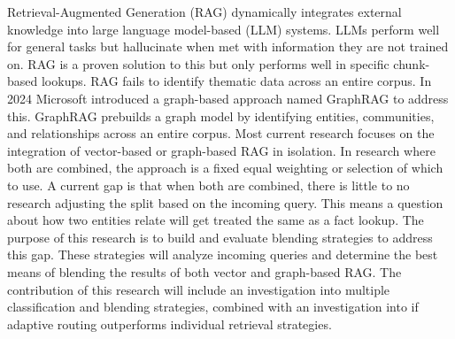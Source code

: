 Retrieval-Augmented Generation (RAG) dynamically integrates external knowledge into large language model-based (LLM) systems.  
LLMs perform well for general tasks but hallucinate when met with information they are not trained on.  
RAG is a proven solution to this but only performs well in specific chunk-based lookups.  
RAG fails to identify thematic data across an entire corpus.  
In 2024 Microsoft introduced a graph-based approach named GraphRAG to address this.  
GraphRAG prebuilds a graph model by identifying entities, communities, and relationships across an entire corpus.  
Most current research focuses on the integration of vector-based or graph-based RAG in isolation.  
In research where both are combined, the approach is a fixed equal weighting or selection of which to use. 
A current gap is that when both are combined, there is little to no research adjusting the split based on the incoming query.  
This means a question about how two entities relate will get treated the same as a fact lookup.  
The purpose of this research is to build and evaluate blending strategies to address this gap.  
These strategies will analyze incoming queries and determine the best means of blending the results of both vector and graph-based RAG.  
The contribution of this research will include an investigation into multiple classification and blending strategies, combined with an investigation into if adaptive routing outperforms individual retrieval strategies. 
